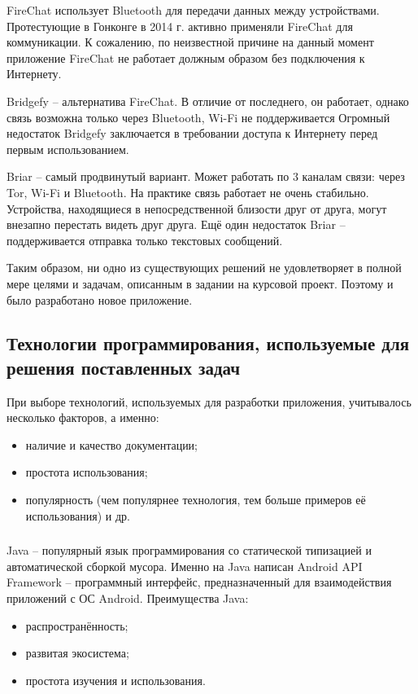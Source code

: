 FireChat использует Bluetooth для передачи данных между устройствами.
Протестующие в Гонконге в 2014 г. активно применяли FireChat для коммуникации.
К сожалению, по неизвестной причине на данный момент приложение FireChat не работает должным образом без подключения к Интернету.

Bridgefy -- альтернатива FireChat.
В отличие от последнего, он работает, однако связь возможна только через Bluetooth, Wi-Fi не поддерживается
Огромный недостаток Bridgefy заключается в требовании доступа к Интернету перед первым использованием.

Briar -- самый продвинутый вариант. Может работать по 3 каналам связи: через Tor, Wi-Fi и Bluetooth.
На практике связь работает не очень стабильно.
Устройства, находящиеся в непосредственной близости друг от друга, могут внезапно перестать видеть друг друга.
Ещё один недостаток Briar -- поддерживается отправка только текстовых сообщений.

Таким образом, ни одно из существующих решений не удовлетворяет в полной мере целями и задачам, описанным в задании на курсовой проект.
Поэтому и было разработано новое приложение.

\subsection{Технологии программирования, используемые для решения поставленных задач}
\label{sub:theory_and_motivation:tools}

При выборе технологий, используемых для разработки приложения, учитывалось несколько факторов, а именно:
\begin{itemize}
	\item наличие и качество документации;
	\item простота использования;
	\item популярность (чем популярнее технология, тем больше примеров её использования) и др.
\end{itemize}

\subsubsection{}
\label{subsub:theory_and_motivation:tools:java}

Java -- популярный язык программирования со статической типизацией и автоматической сборкой мусора.
Именно на Java написан Android API Framework -- программный интерфейс, предназначенный для взаимодействия приложений с ОС Android.
Преимущества Java:
\begin{itemize}
	\item распространённость;
	\item развитая экосистема;
	\item простота изучения и использования.
\end{itemize}

